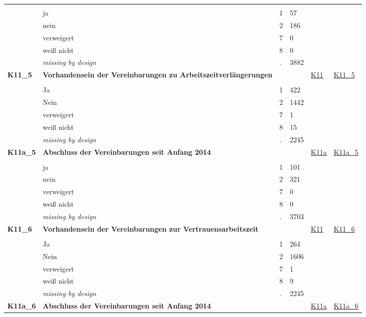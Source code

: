 \begin{longtable}{| L{2.45cm} | L{6cm} | C{1.5cm} | R{1cm} | C{2.25cm} | C{2.25cm} |}
   &  &  &  &  &  \\ 
   & ja & 1 & 57 &  &  \\ 
   & nein & 2 & 186 &  &  \\ 
   & verweigert & 7 & 0 &  &  \\ 
   & weiß nicht & 8 & 0 &  &  \\ 
   & \textit{missing by design} & \textit{.} & 3882 &  &  \\ 
   \midrule
\textbf{K11\_5}\label{var:K11:5} & \textbf{Vorhandensein der Vereinbarungen zu Arbeitszeitverlängerungen} &  &  & \hyperref[K11]{K11} & \hyperref[var:suf:K11:5]{K11\_5} \\ 
   &  &  &  &  &  \\ 
   & Ja & 1 & 422 &  &  \\ 
   & Nein & 2 & 1442 &  &  \\ 
   & verweigert & 7 & 1 &  &  \\ 
   & weiß nicht & 8 & 15 &  &  \\ 
   & \textit{missing by design} & \textit{.} & 2245 &  &  \\ 
   \midrule
\textbf{K11a\_5}\label{var:K11a:5} & \textbf{Abschluss der Vereinbarungen seit Anfang 2014} &  &  & \hyperref[K11a]{K11a} & \hyperref[var:suf:K11a:5]{K11a\_5} \\ 
   &  &  &  &  &  \\ 
   & ja & 1 & 101 &  &  \\ 
   & nein & 2 & 321 &  &  \\ 
   & verweigert & 7 & 0 &  &  \\ 
   & weiß nicht & 8 & 0 &  &  \\ 
   & \textit{missing by design} & \textit{.} & 3703 &  &  \\ 
   \midrule
\textbf{K11\_6}\label{var:K11:6} & \textbf{Vorhandensein der Vereinbarungen zur Vertrauensarbeitszeit} &  &  & \hyperref[K11]{K11} & \hyperref[var:suf:K11:6]{K11\_6} \\ 
   &  &  &  &  &  \\ 
   & Ja & 1 & 264 &  &  \\ 
   & Nein & 2 & 1606 &  &  \\ 
   & verweigert & 7 & 1 &  &  \\ 
   & weiß nicht & 8 & 9 &  &  \\ 
   & \textit{missing by design} & \textit{.} & 2245 &  &  \\ 
   \midrule
\textbf{K11a\_6}\label{var:K11a:6} & \textbf{Abschluss der Vereinbarungen seit Anfang 2014} &  &  & \hyperref[K11a]{K11a} & \hyperref[var:suf:K11a:6]{K11a\_6} \\ 

\end{longtable}
